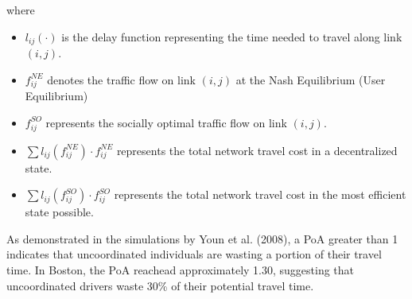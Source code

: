 where

\begin{itemize}
    \item $l_{ij}(\cdot)$ is the delay function representing the time needed to travel along link $(i, j)$.
    \item $f_{ij}^{NE}$ denotes the traffic flow on link $(i, j)$ at the Nash Equilibrium (User Equilibrium)
    \item $f_{ij}^{SO}$ represents the socially optimal traffic flow on link $(i, j)$.
    \item $\sum l_{ij}(f_{ij}^{NE}) \cdot f_{ij}^{NE}$ represents the total network travel cost in a decentralized state.
    \item $\sum l_{ij}(f_{ij}^{SO}) \cdot f_{ij}^{SO}$ represents the total network travel cost in the most efficient state possible.
\end{itemize}

As demonstrated in the simulations by Youn et al. (2008), a PoA greater than 1 indicates that uncoordinated individuals are wasting a portion of their travel time. In Boston, the PoA reachead approximately 1.30, suggesting that uncoordinated drivers waste 30\% of their potential travel time. 

